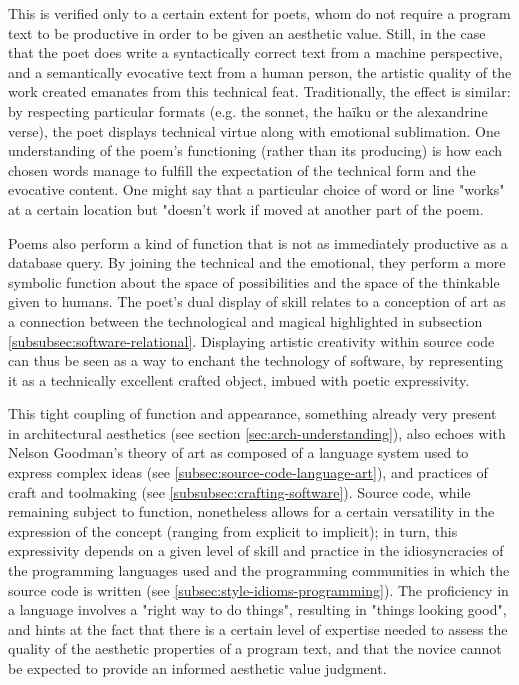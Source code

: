 This is verified only to a certain extent for poets, whom do not require a program text to be productive in order to be given an aesthetic value. Still, in the case that the poet does write a syntactically correct text from a machine perspective, and a semantically evocative text from a human person, the artistic quality of the work created emanates from this technical feat. Traditionally, the effect is similar: by respecting particular formats (e.g. the sonnet, the haïku or the alexandrine verse), the poet displays technical virtue along with emotional sublimation. One understanding of the poem's functioning (rather than its producing) is how each chosen words manage to fulfill the expectation of the technical form and the evocative content. One might say that a particular choice of word or line "works" at a certain location but "doesn't work if moved at another part of the poem.

Poems also perform a kind of function that is not as immediately productive as a database query. By joining the technical and the emotional, they perform a more symbolic function about the space of possibilities and the space of the thinkable given to humans. The poet's dual display of skill relates to a conception of art as a connection between the technological and magical highlighted in subsection \ref{subsubsec:software-relational}. Displaying artistic creativity within source code can thus be seen as a way to enchant the technology of software, by representing it as a technically excellent crafted object, imbued with poetic expressivity.

This tight coupling of function and appearance, something already very present in architectural aesthetics (see section \ref{sec:arch-understanding}), also echoes with Nelson Goodman's theory of art as composed of a language system used to express complex ideas (see \ref{subsec:source-code-language-art}), and practices of craft and toolmaking (see \ref{subsubsec:crafting-software}). Source code, while remaining subject to function, nonetheless allows for a certain versatility in the expression of the concept (ranging from explicit to implicit); in turn, this expressivity depends on a given level of skill and practice in the idiosyncracies of the programming languages used and the programming communities in which the source code is written (see \ref{subsec:style-idioms-programming}). The proficiency in a language involves a "right way to do things", resulting in "things looking good", and hints at the fact that there is a certain level of expertise needed to assess the quality of the aesthetic properties of a program text, and that the novice cannot be expected to provide an informed aesthetic value judgment.

